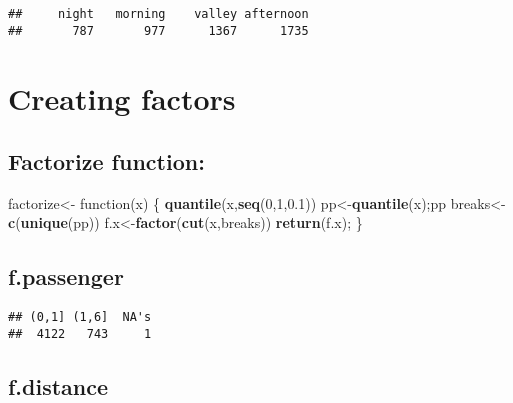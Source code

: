 \documentclass[]{article}
\newenvironment{Shaded}{\begin{snugshade}}{\end{snugshade}}
\newcommand{\KeywordTok}[1]{\textcolor[rgb]{0.13,0.29,0.53}{\textbf{{#1}}}}
\newcommand{\DataTypeTok}[1]{\textcolor[rgb]{0.13,0.29,0.53}{{#1}}}
\newcommand{\DecValTok}[1]{\textcolor[rgb]{0.00,0.00,0.81}{{#1}}}
\newcommand{\FloatTok}[1]{\textcolor[rgb]{0.00,0.00,0.81}{{#1}}}
\newcommand{\StringTok}[1]{\textcolor[rgb]{0.31,0.60,0.02}{{#1}}}
\newcommand{\NormalTok}[1]{{#1}}
\begin{document}
\begin{verbatim}
##     night   morning    valley afternoon 
##       787       977      1367      1735
\end{verbatim}

\section{Creating factors}\label{creating-factors}

\subsection{Factorize function:}\label{factorize-function}

\begin{Shaded}
\begin{Highlighting}[]
\NormalTok{factorize<-}\StringTok{ }\NormalTok{function(x) \{}
  \KeywordTok{quantile}\NormalTok{(x,}\KeywordTok{seq}\NormalTok{(}\DecValTok{0}\NormalTok{,}\DecValTok{1}\NormalTok{,}\FloatTok{0.1}\NormalTok{))}
  \NormalTok{pp<-}\KeywordTok{quantile}\NormalTok{(x);pp}
  \NormalTok{breaks<-}\KeywordTok{c}\NormalTok{(}\KeywordTok{unique}\NormalTok{(pp))}
  \NormalTok{f.x<-}\KeywordTok{factor}\NormalTok{(}\KeywordTok{cut}\NormalTok{(x,breaks))}
  \KeywordTok{return}\NormalTok{(f.x);}
\NormalTok{\}}
\end{Highlighting}
\end{Shaded}

\subsection{f.passenger}\label{f.passenger}

\begin{Shaded}
\end{Shaded}

\begin{verbatim}
## (0,1] (1,6]  NA's 
##  4122   743     1
\end{verbatim}

\subsection{f.distance}\label{f.distance}
\end{document}
